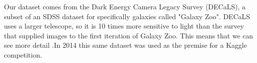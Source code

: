 Our dataset comes from the Dark Energy Camera Legacy Survey (DECaLS), a subset of an SDSS dataset for specifically galaxies called "Galaxy Zoo". DECaLS uses a larger telescope, so it is 10 times more sensitive to light than the survey that supplied images to the first iteration of Galaxy Zoo. This means that we can see more detail \cite{zooniverse}.In 2014 this same dataset was used as the premise for a Kaggle competition.

